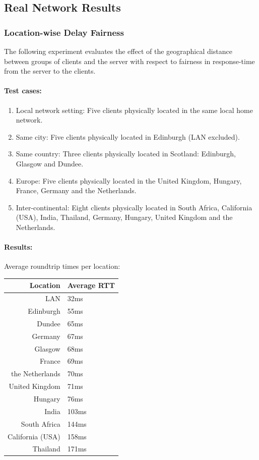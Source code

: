 \documentclass[bsc,frontabs,twoside,singlespacing,parskip,deptreport]{infthesis}     %
\begin{document}
\subsection{Real Network Results}
\subsubsection{Location-wise Delay Fairness}
The following experiment evaluates the effect of the geographical distance between groups of clients and the server with respect to fairness in response-time from the server to the clients.

\paragraph{Test cases:}
\begin{enumerate}
\item Local network setting: Five clients physically located in the same local home network.

\item Same city: Five clients physically located in Edinburgh (LAN excluded).

\item Same country: Three clients physically located in Scotland: Edinburgh, Glasgow and Dundee.

\item Europe: Five clients physically located in the United Kingdom, Hungary, France, Germany and the Netherlands.

\item Inter-continental: Eight clients physically located in South Africa, California (USA), India, Thailand, Germany, Hungary, United Kingdom and the Netherlands.

\end{enumerate}

\paragraph{Results:}Average roundtrip times per location:
\begin{center}
  \begin{tabular}{ r | l }
Location		& Average RTT \\ \hline\hline
LAN				& 32ms	\\
Edinburgh		& 55ms	\\
Dundee			& 65ms	\\
Germany			& 67ms	\\
Glasgow			& 68ms	\\
France			& 69ms	\\
the Netherlands	& 70ms	\\
United Kingdom	& 71ms	\\
Hungary			& 76ms	\\
India			& 103ms	\\
South Africa	& 144ms	\\
California (USA)& 158ms	\\
Thailand		& 171ms	\\
  \end{tabular}
\end{center}
\end{document}
